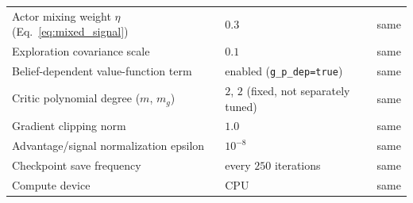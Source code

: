 \documentclass[a4paper,10pt]{article}
\begin{document}
\begin{table}[H]
\begin{tabular}{>{\raggedright\arraybackslash}p{} >{\raggedright\arraybackslash}p{} >{\raggedright\arraybackslash}p{}}
Actor mixing weight $\eta$ (Eq.~\eqref{eq:mixed_signal}) & $0.3$ & same \\
Exploration covariance scale & $0.1$ & same \\
Belief-dependent value-function term & enabled (\texttt{g\_p\_dep=true}) & same \\
Critic polynomial degree ($m$, $m_g$) & $2$, $2$ (fixed, not separately tuned) & same \\
Gradient clipping norm & $1.0$ & same \\
Advantage/signal normalization epsilon & $10^{-8}$ & same \\
Checkpoint save frequency & every $250$ iterations & same \\
Compute device & CPU & same \\
\bottomrule
\end{tabular}
\end{table}
\end{document}
